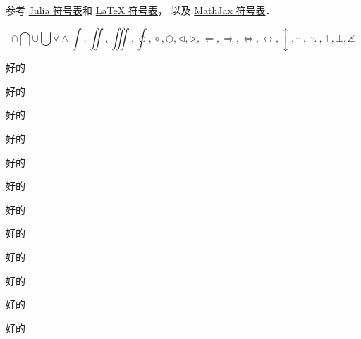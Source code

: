 
参考 \href{https://docs.julialang.org/en/v1/manual/unicode-input/}{Julia 符号表}和 \href{https://oeis.org/wiki/List_of_LaTeX_mathematical_symbols}{LaTeX 符号表}， 以及 \href{http://www.onemathematicalcat.org/MathJaxDocumentation/TeXSyntax.htm#U}{MathJax 符号表}．

\begin{equation}\label{test_eq1}
\cap\bigcap\cup\bigcup\vee\wedge\int, \iint, \iiint, \oint, \diamond, \ominus, \triangleleft, \triangleright, \Longleftarrow, \Longrightarrow, \iff, \leftrightarrow, \updownarrow, \cdots, \ddots, \top, \bot, \measuredangle
\end{equation}

\begin{test}
好的
\end{test}

\begin{subques}
\item 好的
\item 好的
\item 好的
\item 好的
\end{subques}

\begin{test}
好的
\end{test}
\begin{subques}
\item 好的
\item 好的
\item 好的
\item 好的
\end{subques}

\begin{test}\restart
好的
\end{test}

\begin{test}
好的
\end{test}
